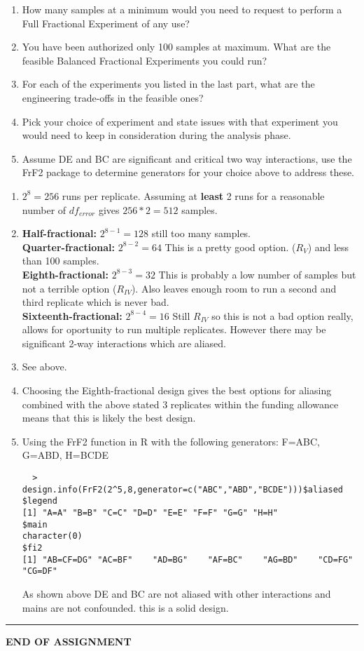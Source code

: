 \documentclass[12pt]{article}
\begin{document}

\begin{enumerate}
  \item How many samples at a minimum would you need to request to perform a Full Fractional Experiment of any use?
  \item You have been authorized only 100 samples at maximum. What are the feasible Balanced Fractional Experiments you could run?
  \item For each of the experiments you listed in the last part, what are the engineering trade-offs in the feasible ones?
  \item Pick your choice of experiment and state issues with that experiment you would need to keep in consideration during the analysis phase.
  \item Assume DE and BC are significant and critical two way interactions, use the FrF2 package to determine generators for your choice above to address these.
\end{enumerate}


\begin{enumerate}
  \item $2^8=256$ runs per replicate. Assuming at \textbf{least} 2 runs for a reasonable number of $df_{error}$ gives $256*2=512$ samples.
  
  \item \textbf{Half-fractional:}	$2^{8-1}=128$ still too many samples.\\
  \textbf{Quarter-fractional:}   $2^{8-2}=64$ This is a pretty good option. ($R_{V}$) and less than 100 samples.\\
  \textbf{Eighth-fractional:} $2^{8-3}=32$ This is probably a low number of samples but not a terrible option ($R_{IV}$). Also leaves enough room to run a second and third replicate which is never bad.\\
  \textbf{Sixteenth-fractional:} $2^{8-4}=16$ Still $R_{IV}$  so this is not a bad option really, allows for oportunity to run multiple replicates. However there may be significant 2-way interactions which are aliased.
  
  \item See above.
  \item Choosing the Eighth-fractional design gives the best options for aliasing combined with the above stated 3 replicates within the funding allowance means that this is likely the best design.
  
  \newpage
  
  
  \item Using the FrF2 function in R with the following generators: F=ABC, G=ABD, H=BCDE
  \begin{lstlisting}
  > design.info(FrF2(2^5,8,generator=c("ABC","ABD","BCDE")))$aliased
$legend
[1] "A=A" "B=B" "C=C" "D=D" "E=E" "F=F" "G=G" "H=H"
$main
character(0)
$fi2
[1] "AB=CF=DG" "AC=BF"    "AD=BG"    "AF=BC"    "AG=BD"    "CD=FG"    "CG=DF" 
  \end{lstlisting}
  As shown above DE and BC are not aliased with other interactions and mains are not confounded. this is a solid design.
  
\end{enumerate}

\noindent\hfil\rule{0.5\textwidth}{.8pt}\hfil
\begin{center}
  \textbf{END OF ASSIGNMENT}
\end{center}
\end{document}
